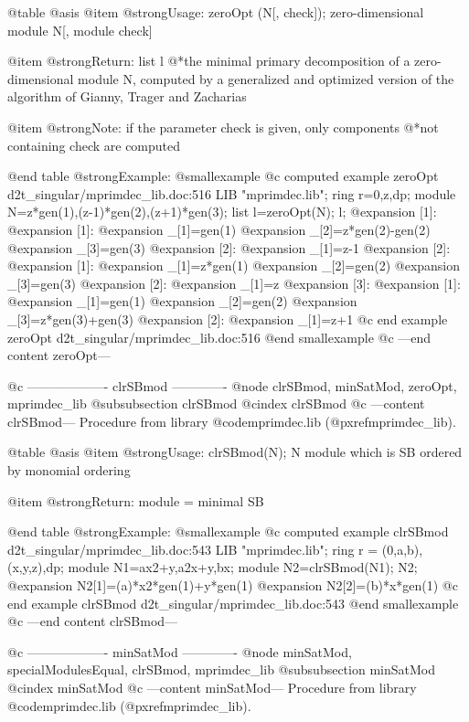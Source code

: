 @table @asis
@item @strong{Usage:}
zeroOpt (N[, check]); zero-dimensional module N[, module check]

@item @strong{Return:}
list l
@*the minimal primary decomposition of a zero-dimensional module N,
computed by a generalized and optimized version of the algorithm
of Gianny, Trager and Zacharias

@item @strong{Note:}
if the parameter check is given, only components
@*not containing check are computed

@end table
@strong{Example:}
@smallexample
@c computed example zeroOpt d2t_singular/mprimdec_lib.doc:516 
LIB "mprimdec.lib";
ring r=0,z,dp;
module N=z*gen(1),(z-1)*gen(2),(z+1)*gen(3);
list l=zeroOpt(N);
l;
@expansion{} [1]:
@expansion{}    [1]:
@expansion{}       _[1]=gen(1)
@expansion{}       _[2]=z*gen(2)-gen(2)
@expansion{}       _[3]=gen(3)
@expansion{}    [2]:
@expansion{}       _[1]=z-1
@expansion{} [2]:
@expansion{}    [1]:
@expansion{}       _[1]=z*gen(1)
@expansion{}       _[2]=gen(2)
@expansion{}       _[3]=gen(3)
@expansion{}    [2]:
@expansion{}       _[1]=z
@expansion{} [3]:
@expansion{}    [1]:
@expansion{}       _[1]=gen(1)
@expansion{}       _[2]=gen(2)
@expansion{}       _[3]=z*gen(3)+gen(3)
@expansion{}    [2]:
@expansion{}       _[1]=z+1
@c end example zeroOpt d2t_singular/mprimdec_lib.doc:516
@end smallexample
@c ---end content zeroOpt---

@c ------------------- clrSBmod -------------
@node clrSBmod, minSatMod, zeroOpt, mprimdec_lib
@subsubsection clrSBmod
@cindex clrSBmod
@c ---content clrSBmod---
Procedure from library @code{mprimdec.lib} (@pxref{mprimdec_lib}).

@table @asis
@item @strong{Usage:}
clrSBmod(N); N module which is SB ordered by monomial ordering

@item @strong{Return:}
module = minimal SB

@end table
@strong{Example:}
@smallexample
@c computed example clrSBmod d2t_singular/mprimdec_lib.doc:543 
LIB "mprimdec.lib";
ring  r = (0,a,b),(x,y,z),dp;
module N1=ax2+y,a2x+y,bx;
module N2=clrSBmod(N1);
N2;
@expansion{} N2[1]=(a)*x2*gen(1)+y*gen(1)
@expansion{} N2[2]=(b)*x*gen(1)
@c end example clrSBmod d2t_singular/mprimdec_lib.doc:543
@end smallexample
@c ---end content clrSBmod---

@c ------------------- minSatMod -------------
@node minSatMod, specialModulesEqual, clrSBmod, mprimdec_lib
@subsubsection minSatMod
@cindex minSatMod
@c ---content minSatMod---
Procedure from library @code{mprimdec.lib} (@pxref{mprimdec_lib}).


